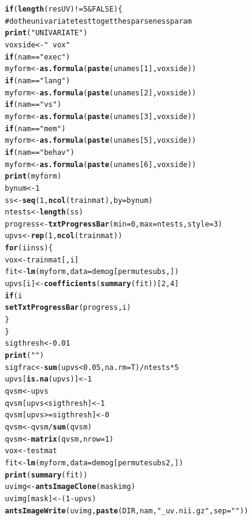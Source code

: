 \documentclass[preprint,authoryear,12pt]{elsarticle}
\makeatletter
\newcommand{\hlfunctioncall}[1]{\textcolor[rgb]{0.501960784313725,0,0.329411764705882}{\textbf{#1}}}%
\newcommand{\hlstring}[1]{\textcolor[rgb]{0.6,0.6,1}{#1}}%
\newcommand{\hlcomment}[1]{\textcolor[rgb]{0.180392156862745,0.6,0.341176470588235}{#1}}%
\newenvironment{kframe}{%
 \def\at@end@of@kframe{}%
 \ifinner\ifhmode%
  \def\at@end@of@kframe{\end{minipage}}%
  \begin{minipage}{\columnwidth}%
 \fi\fi%
 \def\FrameCommand##1{\hskip\@totalleftmargin \hskip-\fboxsep
 \colorbox{shadecolor}{##1}\hskip-\fboxsep
     \hskip-\linewidth \hskip-\@totalleftmargin \hskip\columnwidth}%
 \MakeFramed {\advance\hsize-\width
   \@totalleftmargin\z@ \linewidth\hsize
   \@setminipage}}%
 {\par\unskip\endMakeFramed%
 \at@end@of@kframe}
\newenvironment{knitrout}{}{} %
\makeatother
\begin{document}
\begin{knitrout}
\color{fgcolor}\begin{kframe}
\begin{alltt}

\hlfunctioncall{if} (\hlfunctioncall{length}(resUV) != 5 & FALSE) \{
\hlcomment{    # do the univariate test to get the sparseness param}
    \hlfunctioncall{print}(\hlstring{"UNIVARIATE"})
    voxside <- \hlstring{" ~ vox "}
    \hlfunctioncall{if} (nam == \hlstring{"exec"}) 
        myform <- \hlfunctioncall{as.formula}(\hlfunctioncall{paste}(unames[1], voxside))
    \hlfunctioncall{if} (nam == \hlstring{"lang"}) 
        myform <- \hlfunctioncall{as.formula}(\hlfunctioncall{paste}(unames[2], voxside))
    \hlfunctioncall{if} (nam == \hlstring{"vs"}) 
        myform <- \hlfunctioncall{as.formula}(\hlfunctioncall{paste}(unames[3], voxside))
    \hlfunctioncall{if} (nam == \hlstring{"mem"}) 
        myform <- \hlfunctioncall{as.formula}(\hlfunctioncall{paste}(unames[5], voxside))
    \hlfunctioncall{if} (nam == \hlstring{"behav"}) 
        myform <- \hlfunctioncall{as.formula}(\hlfunctioncall{paste}(unames[6], voxside))
    \hlfunctioncall{print}(myform)
    bynum <- 1
    ss <- \hlfunctioncall{seq}(1, \hlfunctioncall{ncol}(trainmat), by = bynum)
    ntests <- \hlfunctioncall{length}(ss)
    progress <- \hlfunctioncall{txtProgressBar}(min = 0, max = ntests, style = 3)
    upvs <- \hlfunctioncall{rep}(1, \hlfunctioncall{ncol}(trainmat))
    \hlfunctioncall{for} (i in ss) \{
        vox <- trainmat[, i]
        fit <- \hlfunctioncall{lm}(myform, data = demog[permutesubs, ])
        upvs[i] <- \hlfunctioncall{coefficients}(\hlfunctioncall{summary}(fit))[2, 4]
        \hlfunctioncall{if} (i%
            \hlfunctioncall{setTxtProgressBar}(progress, i)
        \}
    \}
    sigthresh <- 0.01
    \hlfunctioncall{print}(\hlstring{""})
    sigfrac <- \hlfunctioncall{sum}(upvs < 0.05, na.rm = T)/ntests * 5
    upvs[\hlfunctioncall{is.na}(upvs)] <- 1
    qvsm <- upvs
    qvsm[upvs < sigthresh] <- 1
    qvsm[upvs >= sigthresh] <- 0
    qvsm <- qvsm/\hlfunctioncall{sum}(qvsm)
    qvsm <- \hlfunctioncall{matrix}(qvsm, nrow = 1)
    vox <- testmat %
    fit <- \hlfunctioncall{lm}(myform, data = demog[permutesubs2, ])
    \hlfunctioncall{print}(\hlfunctioncall{summary}(fit))
    uvimg <- \hlfunctioncall{antsImageClone}(maskimg)
    uvimg[mask] <- (1 - upvs)
    \hlfunctioncall{antsImageWrite}(uvimg, \hlfunctioncall{paste}(DIR, nam, \hlstring{"_uv.nii.gz"}, sep = \hlstring{""}))

\end{alltt}
\end{kframe}
\end{knitrout}
\end{document}
